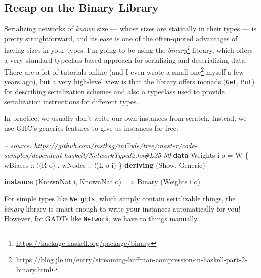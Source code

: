 \documentclass[]{article}
\newenvironment{Shaded}{}{}
\newcommand{\KeywordTok}[1]{\textcolor[rgb]{0.00,0.44,0.13}{\textbf{{#1}}}}
\newcommand{\DataTypeTok}[1]{\textcolor[rgb]{0.56,0.13,0.00}{{#1}}}
\newcommand{\CommentTok}[1]{\textcolor[rgb]{0.38,0.63,0.69}{\textit{{#1}}}}
\newcommand{\OtherTok}[1]{\textcolor[rgb]{0.00,0.44,0.13}{{#1}}}
\newcommand{\FunctionTok}[1]{\textcolor[rgb]{0.02,0.16,0.49}{{#1}}}
\newcommand{\NormalTok}[1]{{#1}}
\renewcommand{\href}[2]{#2\footnote{\url{#1}}}
\begin{document}
\subsection{Recap on the Binary Library}\label{recap-on-the-binary-library}

Serializing networks of \emph{known} size --- whose sizes are statically in
their types --- is pretty straightforward, and its ease is one of the
often-quoted advantages of having sizes in your types. I'm going to be using the
\emph{\href{https://hackage.haskell.org/package/binary}{binary}} library, which
offers a very standard typeclass-based approach for serializing and
deserializing data. There are a lot of tutorials online (and I even
\href{https://blog.jle.im/entry/streaming-huffman-compression-in-haskell-part-2-binary.html}{wrote
a small one} myself a few years ago), but a very high-level view is that the
library offers monads (\texttt{Get}, \texttt{Put}) for describing serialization
schemes and also a typeclass used to provide serialization instructions for
different types.

In practice, we usually don't write our own instances from scratch. Instead, we
use GHC's generics features to give us instances for free:

\begin{Shaded}
\begin{Highlighting}[]
\CommentTok{-- source: https://github.com/mstksg/inCode/tree/master/code-samples/dependent-haskell/NetworkTyped2.hs#L25-30}
\KeywordTok{data} \DataTypeTok{Weights} \NormalTok{i o }\FunctionTok{=} \DataTypeTok{W} \NormalTok{\{}\OtherTok{ wBiases ::} \FunctionTok{!}\NormalTok{(}\DataTypeTok{R} \NormalTok{o)}
                     \NormalTok{,}\OtherTok{ wNodes  ::} \FunctionTok{!}\NormalTok{(}\DataTypeTok{L} \NormalTok{o i)}
                     \NormalTok{\}}
  \KeywordTok{deriving} \NormalTok{(}\DataTypeTok{Show}\NormalTok{, }\DataTypeTok{Generic}\NormalTok{)}

\KeywordTok{instance} \NormalTok{(}\DataTypeTok{KnownNat} \NormalTok{i, }\DataTypeTok{KnownNat} \NormalTok{o) }\OtherTok{=>} \DataTypeTok{Binary} \NormalTok{(}\DataTypeTok{Weights} \NormalTok{i o)}
\end{Highlighting}
\end{Shaded}

For simple types like \texttt{Weights}, which simply contain serializable
things, the \emph{binary} library is smart enough to write your instances
automatically for you! However, for GADTs like \texttt{Network}, we have to
things manually.
\end{document}
